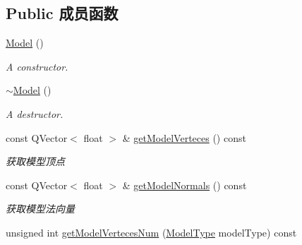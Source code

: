 \subsection*{Public 成员函数}
\begin{DoxyCompactItemize}
\item 
\hypertarget{class_model_ae3b375de5f6df4faf74a95d64748e048}{}\hyperlink{class_model_ae3b375de5f6df4faf74a95d64748e048}{Model} ()\label{class_model_ae3b375de5f6df4faf74a95d64748e048}

\begin{DoxyCompactList}\small\item\em A constructor. \end{DoxyCompactList}\item 
\hypertarget{class_model_ad6ebd2062a0b823db841a0b88baac4c0}{}\hyperlink{class_model_ad6ebd2062a0b823db841a0b88baac4c0}{$\sim$\+Model} ()\label{class_model_ad6ebd2062a0b823db841a0b88baac4c0}

\begin{DoxyCompactList}\small\item\em A destructor. \end{DoxyCompactList}\item 
\hypertarget{class_model_a7277e94b38e6f196f34499a3e9996348}{}const Q\+Vector$<$ float $>$ \& \hyperlink{class_model_a7277e94b38e6f196f34499a3e9996348}{get\+Model\+Verteces} () const \label{class_model_a7277e94b38e6f196f34499a3e9996348}

\begin{DoxyCompactList}\small\item\em 获取模型顶点 \end{DoxyCompactList}\item 
\hypertarget{class_model_ada3d4d3d12d9b59be940584df5231cf9}{}const Q\+Vector$<$ float $>$ \& \hyperlink{class_model_ada3d4d3d12d9b59be940584df5231cf9}{get\+Model\+Normals} () const \label{class_model_ada3d4d3d12d9b59be940584df5231cf9}

\begin{DoxyCompactList}\small\item\em 获取模型法向量 \end{DoxyCompactList}\item 
\hypertarget{class_model_afd605efc0857e7b3789981585e904196}{}unsigned int \hyperlink{class_model_afd605efc0857e7b3789981585e904196}{get\+Model\+Verteces\+Num} (\hyperlink{class_model_a997cd2b5b12b228bfbcdc1829e75352b}{Model\+Type} model\+Type) const \label{class_model_afd605efc0857e7b3789981585e904196}


\end{DoxyCompactItemize}
